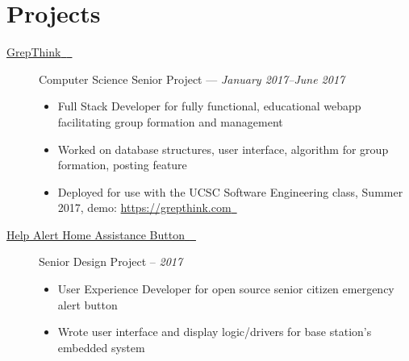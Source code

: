 \documentclass[10pt]{article}
\let\orighref\href
\renewcommand{\href}[2]{\orighref{#1}{#2{\scriptsize~\color{darkgray}\faExternalLink}}}
\renewcommand{\url}[1]{\href{#1}{#1}}
\begin{document}
\section*{Projects}
\begin{description}
  \item[\href{https://github.com/grepthink/grepthink}{GrepThink}] Computer
    Science Senior Project --- \textit{January 2017--June 2017}
    \begin{itemize}
      \item Full Stack Developer for fully functional, educational webapp
        facilitating group formation and management
      \item Worked on database structures, user interface, algorithm for group
        formation, posting feature
      \item Deployed for use with the UCSC Software Engineering class, Summer
        2017, demo: \url{https://grepthink.com}
    \end{itemize}
  \item[\href{https://github.com/HaHaSDP-UCSC}{Help Alert Home Assistance
    Button}] Senior Design Project -- \textit{2017}
    \begin{itemize}
      \item User Experience Developer for open source senior citizen emergency
        alert button
      \item Wrote user interface and display logic/drivers for base station's
        embedded system
    \end{itemize}
\end{description}
\end{document}
